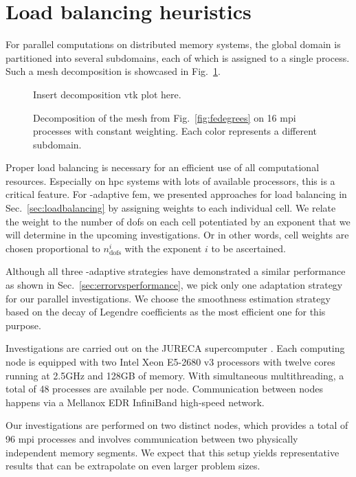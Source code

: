 \section{Load balancing heuristics}
\label{sec:heuristics}


For parallel computations on distributed memory systems, the global domain is partitioned into several subdomains, each of which is assigned to a single process. Such a mesh decomposition is showcased in Fig.~\ref{fig:decomposition}.

\begin{figure}
\centering
Insert decomposition vtk plot here.
\caption{Decomposition of the mesh from Fig.~\ref{fig:fedegrees} on 16 \gls{mpi} processes with constant weighting. Each color represents a different subdomain.}
\label{fig:decomposition}
\end{figure}

Proper load balancing is necessary for an efficient use of all computational resources. Especially on \gls{hpc} systems with lots of available processors, this is a critical feature. For \hp-adaptive \gls{fem}, we presented approaches for load balancing in Sec.~\ref{sec:loadbalancing} by assigning weights to each individual cell. We relate the weight to the number of \glspl{dof} on each cell potentiated by an exponent that we will determine in the upcoming investigations. Or in other words, cell weights are chosen proportional to $n_\text{dofs}^i$ with the exponent $i$ to be ascertained.

Although all three \hp-adaptive strategies have demonstrated a similar performance as shown in Sec.~\ref{sec:errorvsperformance}, we pick only one adaptation strategy for our parallel investigations. We choose the smoothness estimation strategy based on the decay of Legendre coefficients as the most efficient one for this purpose.


Investigations are carried out on the JURECA supercomputer \parencite{krause2016}. Each computing node is equipped with two Intel Xeon E5-2680 v3 processors with twelve cores running at 2.5GHz and 128GB of memory. With simultaneous multithreading, a total of 48 processes are available per node. Communication between nodes happens via a Mellanox EDR InfiniBand high-speed network.

Our investigations are performed on two distinct nodes, which provides a total of 96 \gls{mpi} processes and involves communication between two physically independent memory segments. We expect that this setup yields representative results that can be extrapolate on even larger problem sizes.

